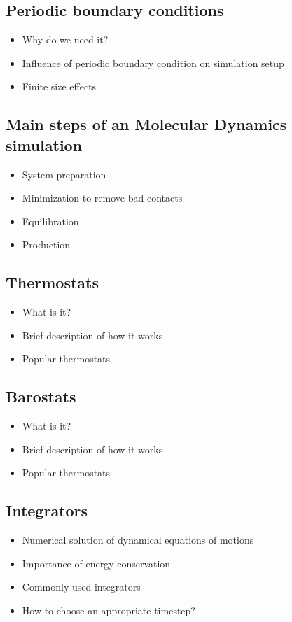 \documentclass[9pt,bestpractices]{livecoms}
\begin{document}
\subsection{Periodic boundary conditions}
\begin{itemize}
\item Why do we need it?
\item Influence of periodic boundary condition on simulation setup
\item Finite size effects
\end{itemize}

\subsection{Main steps of an Molecular Dynamics simulation}
\begin{itemize}
\item System preparation
\item Minimization to remove bad contacts
\item Equilibration
\item Production
\end{itemize}

\subsection{Thermostats}
\begin{itemize}
\item What is it?
\item Brief description of how it works
\item Popular thermostats
\end{itemize}

\subsection{Barostats}
\begin{itemize}
\item What is it?
\item Brief description of how it works
\item Popular thermostats
\end{itemize}

\subsection{Integrators}
\begin{itemize}
\item Numerical solution of dynamical equations of motions
\item Importance of energy conservation
\item Commonly used integrators
\item How to choose an appropriate timestep?
\end{itemize}
\end{document}
